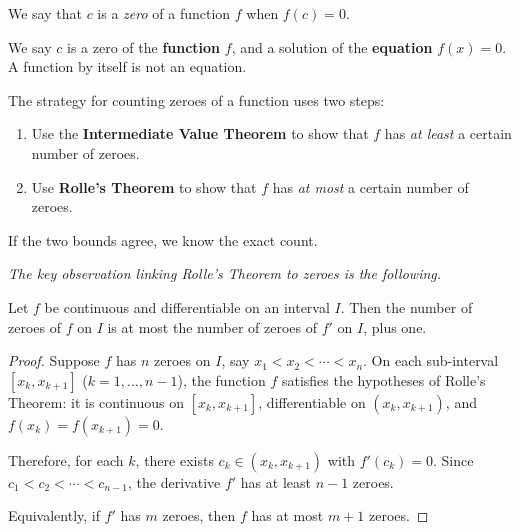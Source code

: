 \begin{definition}
\label{def:5-3}
We say that $c$ is a \emph{zero} of a function $f$ when $f(c) = 0$.
\end{definition}

\begin{remark}[Warning]
We say $c$ is a zero of the \textbf{function} $f$, and a solution of the \textbf{equation} $f(x) = 0$.  A function by itself is not an equation.
\end{remark}

The strategy for counting zeroes of a function uses two steps:
\begin{enumerate}[label=(\roman*)]
  \item Use the \textbf{Intermediate Value Theorem} to show that $f$ has \emph{at least} a certain number of zeroes.
  \item Use \textbf{Rolle's Theorem} to show that $f$ has \emph{at most} a certain number of zeroes.
\end{enumerate}
If the two bounds agree, we know the exact count.

\textit{The key observation linking Rolle's Theorem to zeroes is the following.}

\begin{theorem}
\label{thm:5-4}
Let $f$ be continuous and differentiable on an interval $I$.  Then the number of zeroes of $f$ on $I$ is at most the number of zeroes of $f'$ on $I$, plus one.
\end{theorem}

\begin{proof}
Suppose $f$ has $n$ zeroes on $I$, say $x_{1} < x_{2} < \cdots < x_{n}$.  On each sub-interval $[x_{k}, x_{k+1}]$ ($k = 1, \ldots, n-1$), the function $f$ satisfies the hypotheses of Rolle's Theorem: it is continuous on $[x_{k}, x_{k+1}]$, differentiable on $(x_{k}, x_{k+1})$, and $f(x_{k}) = f(x_{k+1}) = 0$.


Therefore, for each $k$, there exists $c_{k} \in (x_{k}, x_{k+1})$ with $f'(c_{k}) = 0$.  Since $c_{1} < c_{2} < \cdots < c_{n-1}$, the derivative $f'$ has at least $n - 1$ zeroes.

Equivalently, if $f'$ has $m$ zeroes, then $f$ has at most $m + 1$ zeroes.
\end{proof}

